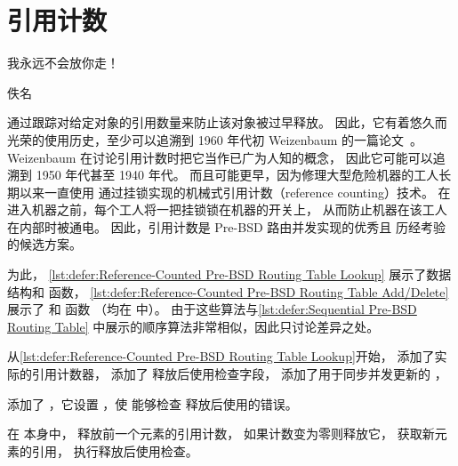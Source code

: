 
\section{引用计数}
\label{sec:defer:Reference Counting}
%
\epigraph{我永远不会放你走！}{佚名}

通过跟踪对给定对象的引用数量来防止该对象被过早释放。
因此，它有着悠久而光荣的使用历史，至少可以追溯到
1960 年代初 Weizenbaum 的一篇论文~\cite{Weizenbaum:1963:SLP:367593.367617}。
Weizenbaum 在讨论引用计数时把它当作已广为人知的概念，
因此它可能可以追溯到 1950 年代甚至 1940 年代。
而且可能更早，因为修理大型危险机器的工人长期以来一直使用
通过挂锁实现的机械式引用计数（reference counting）技术。
在进入机器之前，每个工人将一把挂锁锁在机器的开关上，
从而防止机器在该工人在内部时被通电。
因此，引用计数是 Pre-BSD 路由并发实现的优秀且
历经考验的候选方案。

\begin{listing}

\caption{引用计数 Pre-BSD 路由表查找（有缺陷！！！）}
\label{lst:defer:Reference-Counted Pre-BSD Routing Table Lookup}
\end{listing}

\begin{listing}

\caption{引用计数 Pre-BSD 路由表添加\slash 删除（有缺陷！！！）}
\label{lst:defer:Reference-Counted Pre-BSD Routing Table Add/Delete}
\end{listing}

为此，
\cref{lst:defer:Reference-Counted Pre-BSD Routing Table Lookup}
展示了数据结构和  函数，
\cref{lst:defer:Reference-Counted Pre-BSD Routing Table Add/Delete}
展示了  和  函数
（均在  中）。
由于这些算法与\cref{lst:defer:Sequential Pre-BSD Routing Table}
中展示的顺序算法非常相似，因此只讨论差异之处。

\begin{fcvref}
从\cref{lst:defer:Reference-Counted Pre-BSD Routing Table Lookup}开始，
添加了实际的引用计数器，
添加了  释放后使用检查字段，
添加了用于同步并发更新的 ，
\end{fcvref}
\begin{fcvref}
添加了 ，它设置
，使  能够检查
释放后使用的错误。
\end{fcvref}
\begin{fcvref}
在  本身中，
释放前一个元素的引用计数，
如果计数变为零则释放它，
获取新元素的引用，
执行释放后使用检查。
\end{fcvref}

